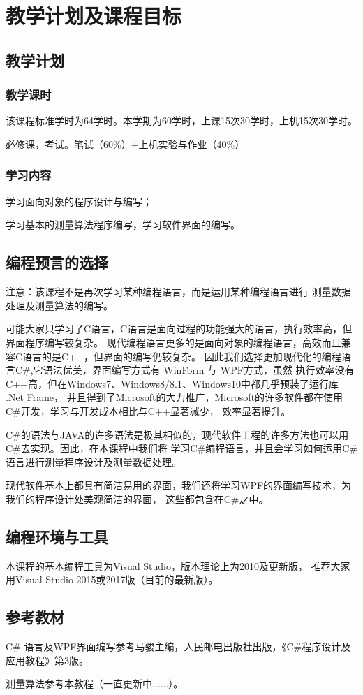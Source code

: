 ﻿%


\chapter{教学计划及课程目标}

\section{教学计划}

\subsection{教学课时}
该课程标准学时为64学时。本学期为60学时，上课15次30学时，上机15次30学时。

必修课，考试。笔试（60\%）+上机实验与作业（40\%）

\subsection{学习内容}

学习面向对象的程序设计与编写；

学习基本的测量算法程序编写，学习软件界面的编写。

\section{编程预言的选择}

注意：该课程不是再次学习某种编程语言，而是运用某种编程语言进行
测量数据处理及测量算法的编写。

可能大家只学习了C语言，C语言是面向过程的功能强大的语言，执行效率高，但界面程序编写较复杂。
现代编程语言更多的是面向对象的编程语言，高效而且兼容C语言的是C++，但界面的编写仍较复杂。
因此我们选择更加现代化的编程语言C\#,它语法优美，界面编写方式有 WinForm 与 WPF方式，虽然
执行效率没有C++高，但在Windows7、Windows8/8.1、Windows10中都几乎预装了运行库 .Net Frame，
并且得到了Microsoft的大力推广，Microsoft的许多软件都在使用C\#开发，学习与开发成本相比与C++显著减少，
效率显著提升。

C\#的语法与JAVA的许多语法是极其相似的，现代软件工程的许多方法也可以用C\#去实现。因此，在本课程中我们将
学习C\#编程语言，并且会学习如何运用C\#语言进行测量程序设计及测量数据处理。

现代软件基本上都具有简洁易用的界面，我们还将学习WPF的界面编写技术，为我们的程序设计处美观简洁的界面，
这些都包含在C\#之中。

\section{编程环境与工具}

本课程的基本编程工具为Visual Studio，版本理论上为2010及更新版，
推荐大家用Visual Studio 2015或2017版（目前的最新版）。

\section{参考教材}

C\# 语言及WPF界面编写参考马骏主编，人民邮电出版社出版，《C\#程序设计及应用教程》第3版。

测量算法参考本教程（一直更新中......）。